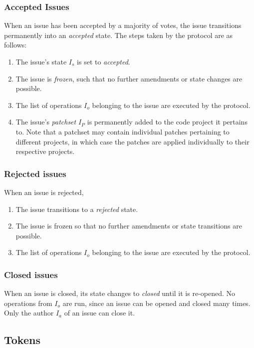 
\subsubsection{Accepted Issues} When an issue has been accepted by a majority
of votes, the issue transitions permanently into an \emph{accepted} state. The
steps taken by the protocol are as follows:

\begin{enumerate}
    \item The issue's state $I_s$ is set to \emph{accepted}.
    \item The issue is \emph{frozen}, such that no further amendments or state
        changes are possible.
    \item The list of operations $I_o$ belonging to the issue are executed by
        the protocol.
    \item The issue's \emph{patchset} $I_P$ is permanently added to the code
        project it pertains to. Note that a patchset may contain individual
        patches pertaining to different projects, in which case the patches are
        applied individually to their respective projects.
\end{enumerate}

\subsubsection{Rejected issues} When an issue is rejected,
\begin{enumerate}
    \item The issue transitions to a \emph{rejected} state.
    \item The issue is frozen so that no further amendments or state
        transitions are possible.
    \item The list of operations $I_o$ belonging to the issue are executed by
        the protocol.
\end{enumerate}

\subsubsection{Closed issues} When an issue is closed, its state changes to
\emph{closed} until it is re-opened. No operations from $I_o$ are run, since
an issue can be opened and closed many times. Only the author $I_a$ of an issue
can close it.

\subsection{Tokens}

